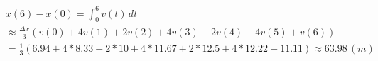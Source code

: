 \documentclass[preview]{standalone}
\begin{document}
\begin{align*}
& x(6) - x(0) = \int_0^6{v(t)\,dt} \\ & \approx \frac{\Delta x}{3}(v(0)+4v(1)+2v(2)+4v(3)+2v(4)+4v(5)+v(6)) \\ & = \frac{1}{3}(6.94+4*8.33+2*10+4*11.67+2*12.5+4*12.22+11.11) \approx 63.98 \,(m)
\end{align*}
\end{document}
